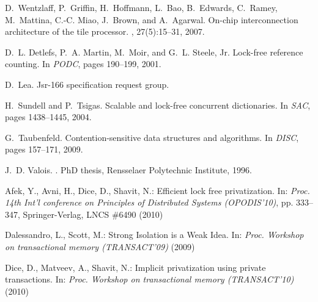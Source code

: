 \begin{thebibliography}{99}
{
D.~Wentzlaff, P.~Griffin, H.~Hoffmann, L.~Bao, B.~Edwards, C.~Ramey,
  M.~Mattina, C.-C. Miao, J.~Brown, and A.~Agarwal.
\newblock On-chip interconnection architecture of the tile processor.
, 27(5):15--31, 2007.











D.~L. Detlefs, P.~A. Martin, M.~Moir, and G.~L. Steele, Jr.
\newblock Lock-free reference counting.
\newblock In {\em PODC}, pages 190--199, 2001.











D.~Lea.
\newblock Jsr-166 specification request group.







H.~Sundell and P.~Tsigas.
\newblock Scalable and lock-free concurrent dictionaries.
\newblock In {\em SAC}, pages 1438--1445, 2004.

G.~Taubenfeld.
\newblock Contention-sensitive data structures and algorithms.
\newblock In {\em DISC}, pages 157--171, 2009.

J.~D. Valois.
.
\newblock PhD thesis, Rensselaer Polytechnic Institute, 1996.









 Afek, Y.,  Avni, H.,   Dice, D.,  Shavit, N.: Efficient lock free privatization. 
In: {\it Proc.  14th Int'l conference on Principles of Distributed Systems 
(OPODIS'10)}, pp. 333--347, Springer-Verlag,  LNCS \#6490 (2010) 



Dalessandro, L., Scott, M.:
Strong Isolation is a Weak Idea. 
In: {\it Proc. Workshop on transactional memory (TRANSACT'09)} (2009)

Dice, D., Matveev, A.,  Shavit, N.:
Implicit privatization using private transactions. 
In: {\it Proc. Workshop on transactional memory (TRANSACT'10)} (2010)





}
\end{thebibliography}
